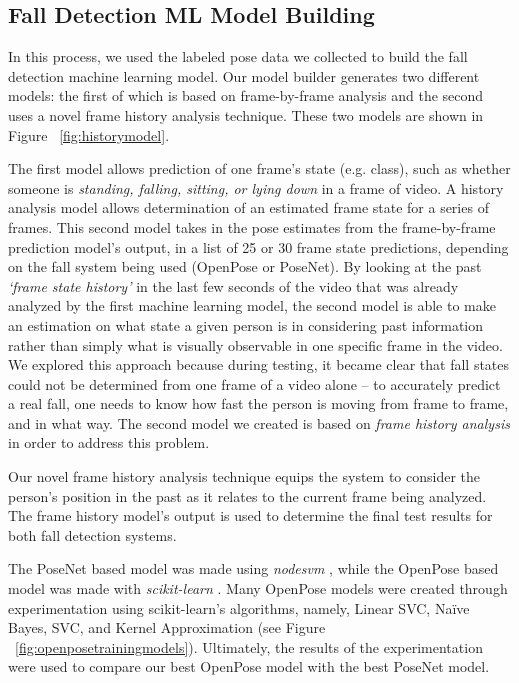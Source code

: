\subsection{Fall Detection ML Model Building}

In this process, we used the labeled pose data we collected to build the fall detection machine learning model. Our model builder generates two different models: the first of which is based on frame-by-frame analysis and the second uses a novel frame history analysis technique. These two models are shown in Figure ~\ref{fig:historymodel}.




The first model allows prediction of one frame’s state (e.g. class), such as whether someone is \textit{standing, falling, sitting, or lying down} in a frame of video. A history analysis model allows determination of an estimated frame state for a series of frames. This second model takes in the pose estimates from the frame-by-frame prediction model’s output, in a list of 25 or 30 frame state predictions, depending on the fall system being used (OpenPose or PoseNet). By looking at the past \textit{‘frame state history’} in the last few seconds of the video that was already analyzed by the first machine learning model, the second model is able to make an estimation on what state a given person is in considering past information rather than simply what is visually observable in one specific frame in the video. We explored this approach because during testing, it became clear that fall states could not be determined from one frame of a video alone – to accurately predict a real fall, one needs to know how fast the person is moving from frame to frame, and in what way. The second model we created is based on \textit{frame history analysis} in order to address this problem.



Our novel frame history analysis technique equips the system to consider the person’s position in the past as it relates to the current frame being analyzed. The frame history model’s output is used to determine the final test results for both fall detection systems.


The PoseNet based model was made using \textit{nodesvm} \cite{RN1003}, while the OpenPose based model was made with \textit{scikit-learn} \cite{posenet2019}. Many OpenPose models were created through experimentation using scikit-learn’s algorithms, namely, Linear SVC, Naïve Bayes, SVC, and Kernel Approximation (see Figure ~\ref{fig:openposetrainingmodels}). Ultimately, the results of the experimentation were used to compare our best OpenPose model with the best PoseNet model.


